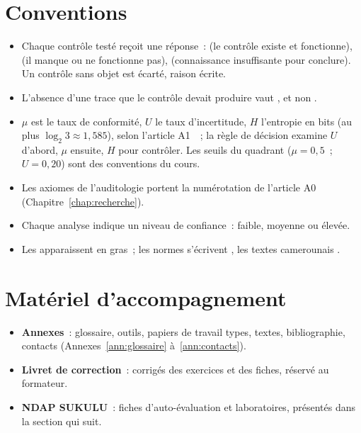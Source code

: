 \section*{Conventions}

\begin{itemize}
    \item Chaque contrôle testé reçoit une réponse~: \OUI{} (le contrôle
          existe et fonctionne), \NON{} (il manque ou ne fonctionne pas),
          \NEK{} (connaissance insuffisante pour conclure). Un contrôle sans
          objet est écarté, raison écrite.
    \item L'absence d'une trace que le contrôle devait produire vaut \NON{},
          et non \NEK{}.
    \item $\mu$ est le taux de conformité, $U$ le taux d'incertitude, $H$
          l'entropie en bits (au plus $\log_2 3 \approx 1{,}585$), selon
          l'article A1~\cite{minka2026nek}~; la règle de décision examine $U$
          d'abord, $\mu$ ensuite, $H$ pour contrôler. Les seuils du quadrant
          ($\mu = 0{,}5$~; $U = 0{,}20$) sont des conventions du cours.
    \item Les axiomes de l'auditologie portent la numérotation de l'article
          A0 (Chapitre~\ref{chap:recherche}).
    \item Chaque analyse indique un niveau de confiance~: faible, moyenne ou
          élevée.
    \item Les  apparaissent en gras~; les normes
          s'écrivent , les textes camerounais
          .
\end{itemize}

\section*{Matériel d'accompagnement}

\begin{itemize}
    \item \textbf{Annexes}~: glossaire, outils, papiers de travail types,
          textes, bibliographie, contacts (Annexes~\ref{ann:glossaire}
          à~\ref{ann:contacts}).
    \item \textbf{Livret de correction}~: corrigés des exercices et des
          fiches, réservé au formateur.
    \item \textbf{NDAP SUKULU}~: fiches d'auto-évaluation et laboratoires,
          présentés dans la section qui suit.
\end{itemize}
